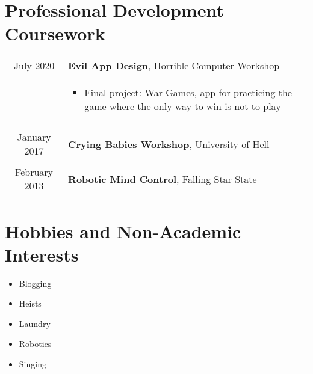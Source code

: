 \documentclass[legalpaper,11pt]{article}
\newenvironment{CVSpan}
{
    \begin{tabular}{S|T}
}
{
     \end{tabular}\vspace{0.5\baselineskip}
}
\newcommand{\CVInfo}[2]{
    #1 & #2\\
}
\newcommand{\CVItems}[1]{
    &
    \begin{itemize}
    #1
    \end{itemize}\\
}
\newcommand{\CVBreak}{
    \multicolumn{2}{c}{}\\
}
\begin{document}

\section{Professional Development Coursework}

\begin{CVSpan}
    \CVInfo{July 2020}{\textbf{Evil App Design}, Horrible Computer Workshop}
    \CVItems{
        \item Final project: \href{https://example.com}{War Games}, app for practicing the game where the only way to win is not to play
    }

    \CVBreak
    
    \CVInfo{January 2017}{\textbf{Crying Babies Workshop}, University of Hell}

    \CVBreak

    \CVInfo{February 2013}{\textbf{Robotic Mind Control}, Falling Star State}
\end{CVSpan}



\section{Hobbies and Non-Academic Interests}

\setlength\multicolsep{0pt}
\begin{multicols}{3}
    \begin{itemize}[leftmargin=*,nosep]
        \item{Blogging}
        \item{Heists}
        \item{Laundry}
        \item{Robotics}
        \item{Singing}
    \end{itemize}
\end{multicols}

\end{document}
